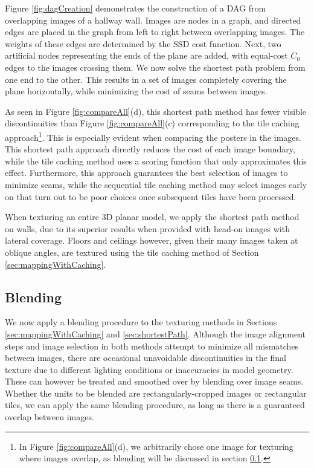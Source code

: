 \documentclass{llncs}
\begin{document}
Figure \ref{fig:dagCreation} demonstrates the construction of a DAG
from overlapping images of a hallway wall. Images are nodes in a
graph, and directed edges are placed in the graph from left to right
between overlapping images. The weights of these edges are determined
by the SSD cost function. Next, two artificial nodes representing the
ends of the plane are added, with equal-cost $C_0$ edges to the images
crossing them. We now solve the shortest path problem from one end to
the other. This results in a set of images completely covering the
plane horizontally, while minimizing the cost of seams between images.

As seen in Figure \ref{fig:compareAll}(d), this shortest path method
has fewer visible discontinuities than Figure \ref{fig:compareAll}(c)
corresponding to the tile caching approach\footnote{In Figure
  \ref{fig:compareAll}(d), we arbitrarily chose one image for
  texturing where images overlap, as blending will be discussed in
  section \ref{sec:blending}.}. This is especially evident when
comparing the posters in the images. This shortest path approach
directly reduces the cost of each image boundary, while the tile
caching method uses a scoring function that only approximates this
effect. Furthermore, this approach guarantees the best selection of
images to minimize seams, while the sequential tile caching method may
select images early on that turn out to be poor choices once
subsequent tiles have been processed.

When texturing an entire 3D planar model, we apply the shortest path
method on walls, due to its superior results when provided with
head-on images with lateral coverage. Floors and ceilings however,
given their many images taken at oblique angles, are textured using
the tile caching method of Section \ref{sec:mappingWithCaching}.

\subsection{Blending}
\label{sec:blending}
We now apply a blending procedure to the texturing methods in Sections
\ref{sec:mappingWithCaching} and \ref{sec:shortestPath}. Although the
image alignment steps and image selection in both methods attempt to
minimize all mismatches between images, there are occasional
unavoidable discontinuities in the final texture due to different
lighting conditions or inaccuracies in model geometry. These can
however be treated and smoothed over by blending over image seams.
Whether the units to be blended are rectangularly-cropped images or
rectangular tiles, we can apply the same blending procedure, as long
as there is a guaranteed overlap between images.
\end{document}
